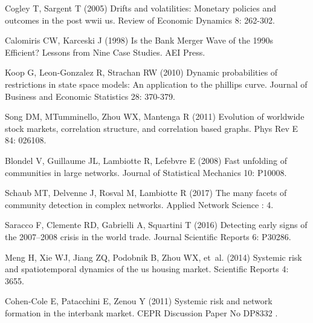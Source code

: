 \documentclass[a4paper,10pt]{article}
\begin{document}
\begin{thebibliography}{100}
Cogley T, Sargent T (2005) Drifts and volatilities: Monetary policies and
  outcomes in the post wwii us.
\newblock Review of Economic Dynamics 8: 262-302.

Calomiris CW, Karceski J (1998) Is the Bank Merger Wave of the 1990s Efficient?
  Lessons from Nine Case Studies.
\newblock AEI Press.

Koop G, Leon-Gonzalez R, Strachan RW (2010) Dynamic probabilities of
  restrictions in state space models: An application to the phillips curve.
\newblock Journal of Business and Economic Statistics 28: 370-379.

Song DM, MTumminello, Zhou WX, Mantenga R (2011) Evolution of worldwide stock
  markets, correlation structure, and correlation based graphs.
\newblock Phys Rev E 84: 026108.

Blondel V, Guillaume JL, Lambiotte R, Lefebvre E (2008) Fast unfolding of
  communities in large networks.
\newblock Journal of Statistical Mechanics 10: P10008.

Schaub MT, Delvenne J, Rosval M, Lambiotte R (2017) The many facets of
  community detection in complex networks.
\newblock Applied Network Science : 4.

Saracco F, Clemente RD, Gabrielli A, Squartini T (2016) Detecting early signs
  of the 2007–2008 crisis in the world trade.
\newblock Journal Scientific Reports 6: P30286.

Meng H, Xie WJ, Jiang ZQ, Podobnik B, Zhou WX, et~al. (2014) Systemic risk and
  spatiotemporal dynamics of the us housing market.
\newblock Scientific Reports 4: 3655.

Cohen-Cole E, Patacchini E, Zenou Y (2011) Systemic risk and network formation
  in the interbank market.
\newblock CEPR Discussion Paper No DP8332 .

\end{thebibliography}
\end{document}
